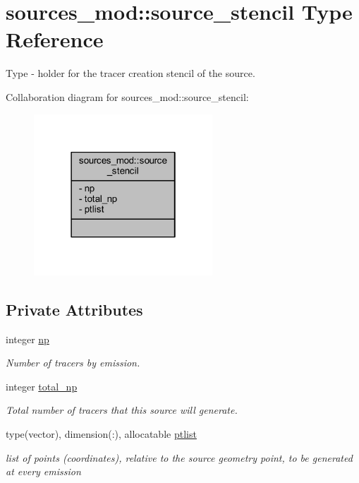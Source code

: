 \hypertarget{structsources__mod_1_1source__stencil}{}\section{sources\+\_\+mod\+:\+:source\+\_\+stencil Type Reference}
\label{structsources__mod_1_1source__stencil}


Type -\/ holder for the tracer creation stencil of the source.  




Collaboration diagram for sources\+\_\+mod\+:\+:source\+\_\+stencil\+:\nopagebreak
\begin{figure}[H]
\begin{center}
\leavevmode
\includegraphics[width=190pt]{structsources__mod_1_1source__stencil__coll__graph}
\end{center}
\end{figure}
\subsection*{Private Attributes}
\begin{DoxyCompactItemize}
\item 
integer \mbox{\hyperlink{structsources__mod_1_1source__stencil_a11ed46a8e923b5902cc02420d88158c5}{np}}
\begin{DoxyCompactList}\small\item\em Number of tracers by emission. \end{DoxyCompactList}\item 
integer \mbox{\hyperlink{structsources__mod_1_1source__stencil_ad7373d51bdf50a4595b6c0fa69f7f915}{total\+\_\+np}}
\begin{DoxyCompactList}\small\item\em Total number of tracers that this source will generate. \end{DoxyCompactList}\item 
type(vector), dimension(\+:), allocatable \mbox{\hyperlink{structsources__mod_1_1source__stencil_a154e50e2872650da574d0a1148e3065a}{ptlist}}
\begin{DoxyCompactList}\small\item\em list of points (coordinates), relative to the source geometry point, to be generated at every emission \end{DoxyCompactList}\end{DoxyCompactItemize}


